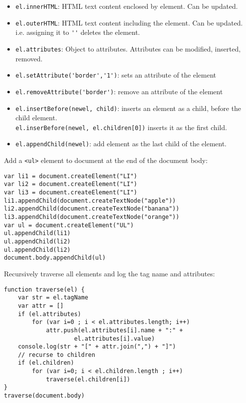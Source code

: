 \documentclass[trans,compress,xcolor=table]{beamer}
\begin{document}
\begin{frame}[fragile]
\begin{itemize}
\item \lstinline!el.innerHTML!: HTML text content enclosed
	by element. Can be updated.
\item \lstinline!el.outerHTML!: HTML text content including
	the element. Can be updated. i.e. assigning it to \lstinline!''!
	deletes the element.
\item \lstinline!el.attributes!: Object to attributes. Attributes
	can be modified, inserted, removed.
\item \lstinline!el.setAttribute('border','1')!:
	sets an attribute of the element \\
\item \lstinline!el.removeAttribute('border')!:
	remove an attribute of the element \\
\item \lstinline!el.insertBefore(newel, child)!: 
	inserts an element as a child, before the child element.\\
	\lstinline!el.inserBefore(newel, el.children[0])! inserts
	it as the first child.
\item \lstinline!el.appendChild(newel)!:
	add element as the last child of the element.
\end{itemize}
\end{frame}

\begin{frame}[fragile]
Add a \lstinline!<ul>! element to document at the end of
the document body:
\begin{lstlisting}
var li1 = document.createElement("LI")
var li2 = document.createElement("LI")
var li3 = document.createElement("LI")
li1.appendChild(document.createTextNode("apple"))
li2.appendChild(document.createTextNode("banana"))
li3.appendChild(document.createTextNode("orange"))
var ul = document.createElement("UL")
ul.appendChild(li1)
ul.appendChild(li2)
ul.appendChild(li2)
document.body.appendChild(ul)
\end{lstlisting}
\end{frame}

\begin{frame}[fragile]
Recursively traverse all elements and log the tag name and
attributes:
\begin{lstlisting}
function traverse(el) {
    var str = el.tagName
    var attr = []
    if (el.attributes)
        for (var i=0 ; i < el.attributes.length; i++)
            attr.push(el.attributes[i].name + ":" + 
                    el.attributes[i].value)
    console.log(str + "[" + attr.join(",") + "]")
    // recurse to children
    if (el.children)
        for (var i=0; i < el.children.length ; i++)
            traverse(el.children[i])
}
traverse(document.body)
\end{lstlisting}
\end{frame}
\end{document}
